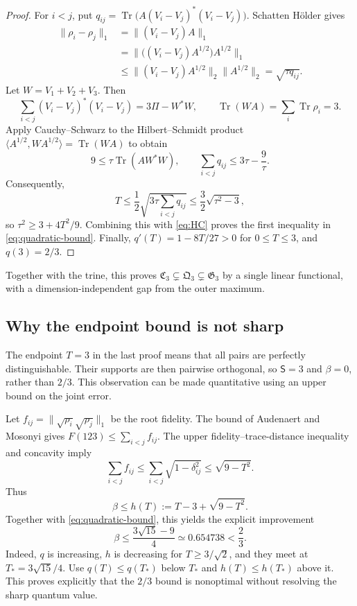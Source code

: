 \documentclass[a4paper,11pt,onecolumn,unpublished]{quantumarticle}
\theoremstyle{definition}
\newcommand{\Tr}{\operatorname{Tr}}
\newcommand{\1}{\mathbf 1}
\newcommand{\Creg}{\mathfrak C}
\newcommand{\Qreg}{\mathfrak Q}
\newcommand{\Greg}{\mathfrak G}
\newcommand{\Sopt}{\mathsf S}
\begin{document}
\begin{proof}
For $i<j$, put
$q_{ij}=\Tr\bigl(A(V_i-V_j)^*(V_i-V_j)\bigr)$. Schatten H\"older gives
\begin{align}
 \|\rho_i-\rho_j\|_1
 &=\|(V_i-V_j)A\|_1\nonumber\\
 &=\|\bigl((V_i-V_j)A^{1/2}\bigr)A^{1/2}\|_1\nonumber\\
 &\le\|(V_i-V_j)A^{1/2}\|_2\|A^{1/2}\|_2
 =\sqrt{\tau q_{ij}}.\label{eq:holder}
\end{align}
Let $W=V_1+V_2+V_3$. Then
\[
 \sum_{i<j}(V_i-V_j)^*(V_i-V_j)=3\Pi-W^*W,
 \qquad\Tr(WA)=\sum_i\Tr\rho_i=3.
\]
Apply Cauchy--Schwarz to the Hilbert--Schmidt product
$\langle A^{1/2},WA^{1/2}\rangle=\Tr(WA)$ to obtain
\[
 9\le\tau\Tr(AW^*W),\qquad
 \sum_{i<j}q_{ij}\le3\tau-\frac9\tau.
\]
Consequently,
\[
 T\le\frac12\sqrt{3\tau\sum_{i<j}q_{ij}}
 \le\frac32\sqrt{\tau^2-3},
\]
so $\tau^2\ge3+4T^2/9$. Combining this with \eqref{eq:HC} proves the first
inequality in \eqref{eq:quadratic-bound}. Finally,
$q'(T)=1-8T/27>0$ for $0\le T\le3$, and $q(3)=2/3$.
\end{proof}

Together with the trine, this proves
$\Creg_3\subsetneq\Qreg_3\subsetneq\Greg_3$ by a single linear functional,
with a dimension-independent gap from the outer maximum.

\subsection{Why the endpoint bound is not sharp}

The endpoint $T=3$ in the last proof means that all pairs are perfectly
distinguishable. Their supports are then pairwise orthogonal, so
$\Sopt=3$ and $\beta=0$, rather than $2/3$. This observation can be made
quantitative using an upper bound on the joint error.

Let $f_{ij}=\|\sqrt{\rho_i}\sqrt{\rho_j}\|_1$ be the root fidelity. The bound of
Audenaert and Mosonyi \cite[Theorem~3.1]{AudenaertMosonyi2014} gives
$F(123)\le\sum_{i<j}f_{ij}$. The upper fidelity--trace-distance inequality and
concavity imply
\[
 \sum_{i<j}f_{ij}
 \le\sum_{i<j}\sqrt{1-\delta_{ij}^2}
 \le\sqrt{9-T^2}.
\]
Thus
\begin{equation}\label{eq:AM-beta}
 \beta\le h(T):=T-3+\sqrt{9-T^2}.
\end{equation}
Together with \eqref{eq:quadratic-bound}, this yields the explicit improvement
\begin{equation}\label{eq:AM-refinement}
 \beta\le\frac{3\sqrt{15}-9}{4}\simeq0.654738<\frac23.
\end{equation}
Indeed, $q$ is increasing, $h$ is decreasing for $T\ge3/\sqrt2$, and they meet
at $T_*=3\sqrt{15}/4$. Use $q(T)\le q(T_*)$ below $T_*$ and
$h(T)\le h(T_*)$ above it. This proves explicitly that the $2/3$ bound is
nonoptimal without resolving the sharp quantum value.
\end{document}
